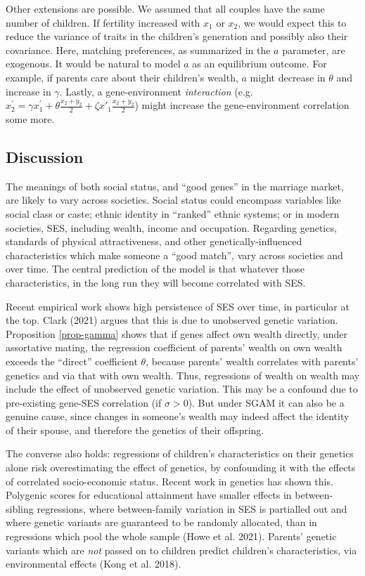 \documentclass[
]{article}
\theoremstyle{definition}
\theoremstyle{definition}
\theoremstyle{definition}
\theoremstyle{definition}
\theoremstyle{remark}
\begin{document}
Other extensions are possible. We assumed that all couples have the same number
of children. If fertility increased with \(x_1\) or \(x_2\), we would expect this to
reduce the variance of traits in the children's generation and possibly also
their covariance. Here, matching preferences, as summarized in the \(a\) parameter,
are exogenous. It would be natural to model \(a\) as an equilibrium outcome.
For example, if parents care about their children's wealth, \(a\) might decrease
in \(\theta\) and increase in \(\gamma\). Lastly, a gene-environment \emph{interaction}
(e.g.~\(x^\prime_2 = \gamma x^\prime_1 + \theta\frac{x_2+y_2}{2} + \zeta x'_1\frac{x_2+y_2}{2}\)) might increase the gene-environment
correlation some more.

\hypertarget{discussion}{%
\subsection{Discussion}\label{discussion}}

The meanings of both social status, and ``good genes'' in the
marriage market, are likely to vary across societies. Social status could
encompass variables like social class or caste; ethnic identity in
``ranked'' ethnic systems; or in modern societies, SES, including wealth, income
and occupation. Regarding genetics, standards of physical attractiveness, and
other genetically-influenced characteristics which make someone a ``good match'',
vary across societies and over time. The central prediction of the model is that
whatever those characteristics, in the long run they will become correlated with
SES.

Recent empirical work shows high persistence of SES over time, in particular at
the top. Clark (2021) argues that this is due to unobserved genetic variation.
Proposition \ref{prop-gamma} shows that if genes affect own wealth directly,
under assortative mating, the regression coefficient of parents' wealth on own
wealth exceeds the ``direct'' coefficient \(\theta\), because parents' wealth
correlates with parents' genetics and via that with own wealth. Thus,
regressions of wealth on wealth may include the effect of unobserved genetic
variation. This may be a confound due to pre-existing gene-SES correlation
(if \(\sigma > 0\)). But under SGAM it can also be a genuine cause, since changes
in someone's wealth may indeed affect the identity of their spouse, and therefore
the genetics of their offspring.

The converse also holds: regressions of children's characteristics on their
genetics alone risk overestimating the effect of genetics, by confounding it
with the effects of correlated socio-economic status. Recent work in genetics
has shown this. Polygenic scores for educational attainment have smaller effects
in between-sibling regressions, where between-family variation in SES is
partialled out and where genetic variants are guaranteed to be randomly
allocated, than in regressions which pool the whole sample (Howe et al. 2021).
Parents' genetic variants which are \emph{not} passed on to children predict
children's characteristics, via environmental effects (Kong et al. 2018).
\end{document}
